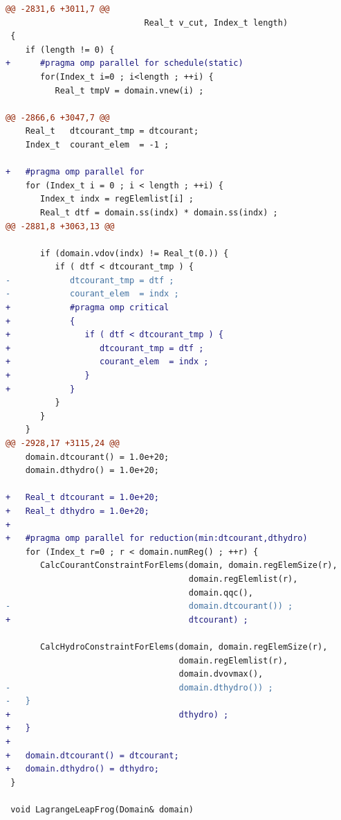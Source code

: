 \begin{lstlisting}[language=diff,basicstyle=\ttfamily\scriptsize,breaklines=true,caption={llnl_c1/lulesh — BROKEN (e6c_r1)}]
@@ -2831,6 +3011,7 @@
                            Real_t v_cut, Index_t length)
 {
    if (length != 0) {
+      #pragma omp parallel for schedule(static)
       for(Index_t i=0 ; i<length ; ++i) {
          Real_t tmpV = domain.vnew(i) ;
 
@@ -2866,6 +3047,7 @@
    Real_t   dtcourant_tmp = dtcourant;
    Index_t  courant_elem  = -1 ;
 
+   #pragma omp parallel for
    for (Index_t i = 0 ; i < length ; ++i) {
       Index_t indx = regElemlist[i] ;
       Real_t dtf = domain.ss(indx) * domain.ss(indx) ;
@@ -2881,8 +3063,13 @@
 
       if (domain.vdov(indx) != Real_t(0.)) {
          if ( dtf < dtcourant_tmp ) {
-            dtcourant_tmp = dtf ;
-            courant_elem  = indx ;
+            #pragma omp critical
+            {
+               if ( dtf < dtcourant_tmp ) {
+                  dtcourant_tmp = dtf ;
+                  courant_elem  = indx ;
+               }
+            }
          }
       }
    }
@@ -2928,17 +3115,24 @@
    domain.dtcourant() = 1.0e+20;
    domain.dthydro() = 1.0e+20;
 
+   Real_t dtcourant = 1.0e+20;
+   Real_t dthydro = 1.0e+20;
+
+   #pragma omp parallel for reduction(min:dtcourant,dthydro)
    for (Index_t r=0 ; r < domain.numReg() ; ++r) {
       CalcCourantConstraintForElems(domain, domain.regElemSize(r),
                                     domain.regElemlist(r),
                                     domain.qqc(),
-                                    domain.dtcourant()) ;
+                                    dtcourant) ;
 
       CalcHydroConstraintForElems(domain, domain.regElemSize(r),
                                   domain.regElemlist(r),
                                   domain.dvovmax(),
-                                  domain.dthydro()) ;
-   }
+                                  dthydro) ;
+   }
+
+   domain.dtcourant() = dtcourant;
+   domain.dthydro() = dthydro;
 }
 
 void LagrangeLeapFrog(Domain& domain)
\end{lstlisting}
